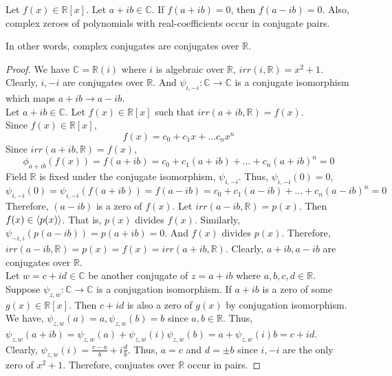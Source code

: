 \begin{corollary}
	Let $f(x) \in \mathbb{R}[x]$.
	Let $a+ib \in \mathbb{C}$.
	If $f(a+ib) = 0$, then $f(a-ib) = 0$.
	Also, complex zeroes of polynomials with real-coefficients occur in conjugate pairs.
\end{corollary}
\begin{important}
	In other words, complex conjugates are conjugates over $\mathbb{R}$.
\end{important}
\begin{proof} 
	We have $\mathbb{C} = \mathbb{R}(i)$ where $i$ is algebraic over $\mathbb{R}$, $irr(i,\mathbb{R}) = x^2+1$.
	Clearly, $i,-i$ are conjugates over $\mathbb{R}$.
	And $\psi_{i,-i} : \mathbb{C} \to \mathbb{C}$ is a conjugate isomorphism which maps $a+ib \to a-ib$.\\

	Let $a+ib \in \mathbb{C}$.
	Let $f(x) \in \mathbb{R}[x]$ such that $irr(a+ib,\mathbb{R}) = f(x)$.\\
	Since $f(x) \in \mathbb{R}[x]$,
	\[ f(x) = c_0 + c_1x+ \dots c_nx^n \]
	Since $irr(a+ib,\mathbb{R}) = f(x)$,
	\[ \phi_{a+ib}(f(x)) = f(a+ib) = c_0 + c_1(a+ib) + \dots + c_n(a+ib)^n = 0 \]
	Field $\mathbb{R}$ is fixed under the conjugate isomorphism, $\psi_{i,-i}$.
	Thus, $\psi_{i,-i}(0) = 0$,
	\[ \psi_{i,-i}(0) = \psi_{i,-i}(f(a+ib)) = f(a-ib) = c_0 + c_1(a-ib) + \dots + c_n(a-ib)^n = 0 \]
	Therefore, $(a-ib)$ is a zero of $f(x)$.
	Let $irr(a-ib,\mathbb{R}) = p(x)$.
	Then $f(x) \in \langle p(x)\rangle$.
	That is, $p(x)$ divides $f(x)$.
	Similarly, $\psi_{-i,i}(p(a-ib)) = p(a+ib) = 0$.
	And $f(x)$ divides $p(x)$.
	Therefore, $irr(a-ib,\mathbb{R}) = p(x) = f(x) = irr(a+ib,\mathbb{R})$.
	Clearly, $a+ib,a-ib$ are conjugates over $\mathbb{R}$.\\
	
	Let $w = c+id \in \mathbb{C}$ be another conjugate of $z=a+ib$ where $a,b,c,d \in \mathbb{R}$.
	Suppose $\psi_{z,w} : \mathbb{C} \to \mathbb{C}$ is a conjugation isomorphism.
	If $a+ib$ is a zero of some $g(x) \in \mathbb{R}[x]$.
	Then $c+id$ is also a zero of $g(x)$ by conjugation isomorphism.
	We have, $\psi_{z,w}(a) = a, \psi_{z,w}(b) = b$ since $a,b \in \mathbb{R}$.
	Thus, $\psi_{z,w}(a+ib) = \psi_{z,w}(a) + \psi_{z,w}(i)\psi_{z,w}(b) = a+\psi_{z,w}(i)b = c+id$.
	Clearly, $\psi_{z,w}(i) = \frac{c-a}{b} + i\frac{d}{b}$.
	Thus, $a=c$ and $d = \pm b$ since $i,-i$ are the only zero of $x^2+1$.
	Therefore, conjuates over $\mathbb{R}$ occur in pairs.
\end{proof} 

